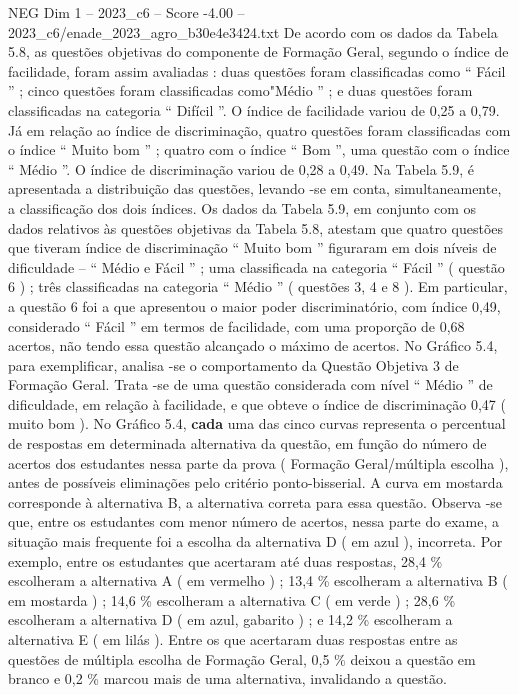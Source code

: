 \begin{textsample}{NEG Dim 1 – 2023\_c6 – Score -4.00 – 2023\_c6/enade\_2023\_agro\_b30e4e3424.txt}
De acordo com os dados da Tabela 5.8, as questões objetivas do componente de Formação Geral, segundo o índice de facilidade, foram assim avaliadas : duas questões foram classificadas como “ Fácil ” ; cinco questões foram classificadas como"Médio ” ; e duas questões foram classificadas na categoria “ Difícil ”.
O índice de facilidade variou de 0,25 a 0,79.
Já em relação ao índice de discriminação, quatro questões foram classificadas com o índice “ Muito bom ” ; quatro com o índice “ Bom ”, uma questão com o índice “ Médio ”.
O índice de discriminação variou de 0,28 a 0,49.
Na Tabela 5.9, é apresentada a distribuição das questões, levando -se em conta, simultaneamente, a classificação dos dois índices.
Os dados da Tabela 5.9, em conjunto com os dados relativos às questões objetivas da Tabela 5.8, atestam que quatro questões que tiveram índice de discriminação “ Muito bom ” figuraram em dois níveis de dificuldade – “ Médio e Fácil ” ; uma classificada na categoria “ Fácil ” ( questão 6 ) ; três classificadas na categoria “ Médio ” ( questões 3, 4 e 8 ).
Em particular, a questão 6 foi a que apresentou o maior poder discriminatório, com índice 0,49, considerado “ Fácil ” em termos de facilidade, com uma proporção de 0,68 acertos, não tendo essa questão alcançado o máximo de acertos.
No Gráfico 5.4, para exemplificar, analisa -se o comportamento da Questão Objetiva 3 de Formação Geral.
Trata -se de uma questão considerada com nível “ Médio ” de dificuldade, em relação à facilidade, e que obteve o índice de discriminação 0,47 ( muito bom ).
No Gráfico 5.4, \textbf{cada} uma das cinco curvas representa o percentual de respostas em determinada alternativa da questão, em função do número de acertos dos estudantes nessa parte da prova ( Formação Geral/múltipla escolha ), antes de possíveis eliminações pelo critério ponto-bisserial.
A curva em mostarda corresponde à alternativa B, a alternativa correta para essa questão.
Observa -se que, entre os estudantes com menor número de acertos, nessa parte do exame, a situação mais frequente foi a escolha da alternativa D ( em azul ), incorreta.
Por exemplo, entre os estudantes que acertaram até duas respostas, 28,4 \% escolheram a alternativa A ( em vermelho ) ; 13,4 \% escolheram a alternativa B ( em mostarda ) ; 14,6 \% escolheram a alternativa C ( em verde ) ; 28,6 \% escolheram a alternativa D ( em azul, gabarito ) ; e 14,2 \% escolheram a alternativa E ( em lilás ).
Entre os que acertaram duas respostas entre as questões de múltipla escolha de Formação Geral, 0,5 \% deixou a questão em branco e 0,2 \% marcou mais de uma alternativa, invalidando a questão.

\end{textsample}
